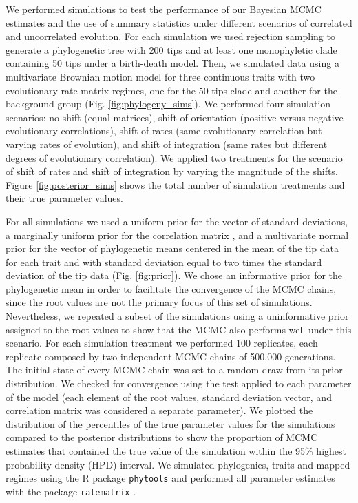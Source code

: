 We performed simulations to test the performance of our Bayesian MCMC estimates and the use of summary statistics under different scenarios of correlated and uncorrelated evolution. For each simulation we used rejection sampling to generate a phylogenetic tree with 200 tips and at least one monophyletic clade containing 50 tips under a birth-death model. Then, we simulated data using a multivariate Brownian motion model for three continuous traits with two evolutionary rate matrix regimes, one for the 50 tips clade and another for the background group (Fig. \ref{fig:phylogeny_sims}). We performed four simulation scenarios: no shift (equal matrices), shift of orientation (positive versus negative evolutionary correlations), shift of rates (same evolutionary correlation but varying rates of evolution), and shift of integration (same rates but different degrees of evolutionary correlation). We applied two treatments for the scenario of shift of rates and shift of integration by varying the magnitude of the shifts. Figure \ref{fig:posterior_sims} shows the total number of simulation treatments and their true parameter values.

For all simulations we used a uniform prior for the vector of standard deviations, a marginally uniform prior for the correlation matrix \citep{barnard_modeling_2000}, and a multivariate normal prior for the vector of phylogenetic means centered in the mean of the tip data for each trait and with standard deviation equal to two times the standard deviation of the tip data (Fig. \ref{fig:prior}). We chose an informative prior for the phylogenetic mean in order to facilitate the convergence of the MCMC chains, since the root values are not the primary focus of this set of simulations. Nevertheless, we repeated a subset of the simulations using a uninformative prior assigned to the root values to show that the MCMC also performs well under this scenario. For each simulation treatment we performed 100 replicates, each replicate composed by two independent MCMC chains of 500,000 generations. The initial state of every MCMC chain was set to a random draw from its prior distribution. We checked for convergence using the \citet{gelman_R_1992} test applied to each parameter of the model (each element of the root values, standard deviation vector, and correlation matrix was considered a separate parameter). We plotted the distribution of the percentiles of the true parameter values for the simulations compared to the posterior distributions to show the proportion of MCMC estimates that contained the true value of the simulation within the 95\% highest probability density (HPD) interval. We simulated phylogenies, traits and mapped regimes using the R package \texttt{phytools} \citep{revell_phytools:_2012} and performed all parameter estimates with the package \texttt{ratematrix} \citep{caetano_ratematrix_2017}.

